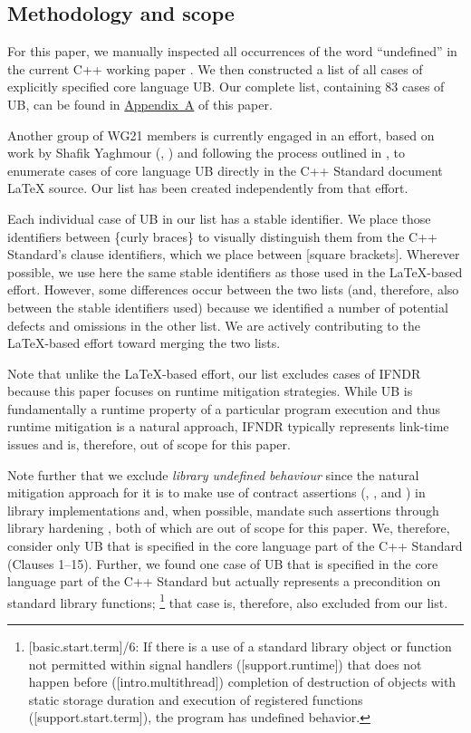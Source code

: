 \subsection{Methodology and scope}

For this paper, we manually inspected all occurrences of the word ``undefined'' in the current C++ working paper \cite{N5008}. We then constructed a list of all cases of explicitly specified core language UB. Our complete list, containing 83 cases of UB, can be found in \hyperref[appendix]{Appendix~A} of this paper. 

Another group of WG21 members is currently engaged in an effort, based on work by Shafik Yaghmour (\cite{P1705R1}, \cite{P3075R0}) and following the process outlined in \cite{P3656R1}, to enumerate cases of core language UB directly in the C++ Standard document  \LaTeX{} source. Our list has been created independently from that effort.

Each individual case of UB in our list has a stable identifier. We place those identifiers between \{curly braces\} to visually distinguish them from the C++ Standard's clause identifiers, which we place between [square brackets]. Wherever possible, we use here the same stable identifiers as those used in the \LaTeX-based effort. However, some differences occur between the two lists (and, therefore, also between the stable identifiers used) because we identified a number of potential defects and omissions in the other list. We are actively contributing to the \LaTeX-based effort toward merging the two lists. 

Note that unlike the \LaTeX-based effort, our list excludes cases of IFNDR because this paper focuses on runtime mitigation strategies. While UB is fundamentally a runtime property of a particular program execution and thus runtime mitigation is a natural approach, IFNDR typically represents link-time issues and is, therefore, out of scope for this paper.

Note further that we exclude \emph{library undefined behaviour} since the natural mitigation approach for it is to make use of contract assertions (, , and ) in library implementations and, when possible, mandate such assertions through library hardening \cite{P3471R4}, both of which are out of scope for this paper. We, therefore, consider only UB that is specified in the core language part of the C++ Standard (Clauses 1--15). Further, we found one case of UB that is specified in the core language part of the C++ Standard but actually represents a precondition on standard library functions; %
\footnote{[basic.start.term]/6: If there is a use of a standard library object or function not permitted within signal handlers ([support.runtime]) that does not happen before ([intro.multithread]) completion of destruction of objects with static storage duration and execution of  registered functions ([support.start.term]), the program has undefined behavior.}
that case is, therefore, also excluded from our list.

